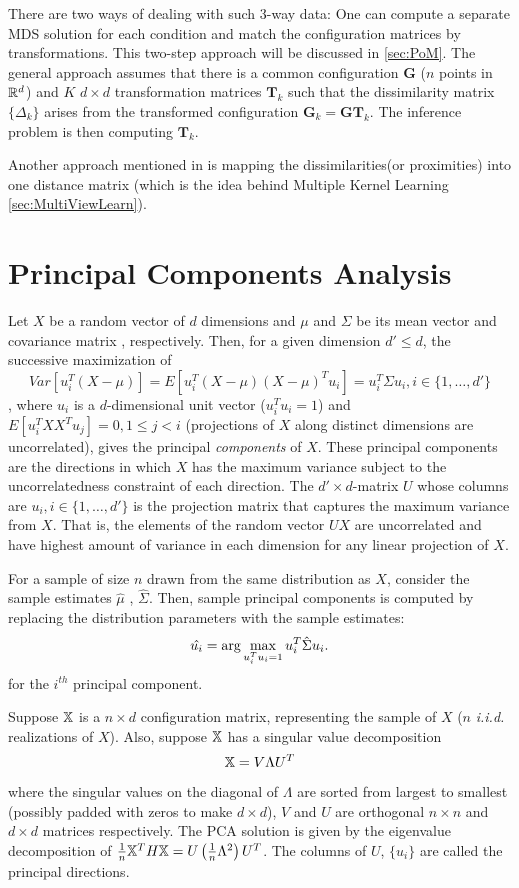 \documentclass[12pt,oneside,final]{thesis}\usepackage[]{graphicx}\usepackage[]{color}
\begin{document}
There are two ways of dealing with such 3-way data: One can compute a separate MDS solution for  each condition and match the configuration matrices by transformations. This two-step approach will be discussed in \autoref{sec:PoM}. The general approach assumes that there is a common configuration $\mathbf{G}$ ($n$ points in $\mathbb{R}^{d}$) and $K$ $d \times d$ transformation matrices ${\mathbf{T}_k}$ such that the dissimilarity matrix $\{\Delta_k\}$ arises  from the transformed configuration $\mathbf{G}_k =\mathbf{G}\mathbf{T}_k$. The inference problem is then computing $\mathbf{T}_k$.

Another approach mentioned in \cite{borg+groenen:1997} is  mapping the dissimilarities(or proximities) into one distance matrix (which is the idea behind Multiple Kernel Learning \ref{sec:MultiViewLearn}).


\section{Principal Components Analysis}
Let $X$ be a random vector of   $d$ dimensions and $\mu$ and $\Sigma$ be its mean vector and covariance matrix , respectively. Then, for a given dimension $d'\leq d$, the successive maximization of  $$Var[u_{i}^T (X-\mu)]= E[u_{i}^T (X-\mu)(X-\mu)^T u_i]=u_{i}^T\Sigma u_{i},  i \in \{1,\ldots,d'\}$$, where $u_{i}$ is a  $d$-dimensional unit vector ($u_i^Tu_i=1$)  and $E[u_{i}^T X X^T u_j]=0 , 1\leq j<i$ (projections of $X$ along distinct dimensions are uncorrelated), gives the principal \emph{components} of $X$. These principal components are the directions in which $X$ has the maximum variance subject to the uncorrelatedness constraint of each direction. The $d' \times d$-matrix $U$ whose columns are $u_i, i \in \{1,\ldots,d'\}$  is the projection matrix that captures the maximum variance from $X$. That is, the elements of the random vector $UX$ are uncorrelated and have highest amount of variance in each dimension for any linear projection of $X$.

For a sample of size $n$ drawn from the same distribution as $X$, consider the sample estimates $\hat{\mu}$ ,  $\hat{\Sigma} $. Then, sample principal components  is computed by replacing the distribution parameters with the sample estimates:
 \[\hat{u_i}=\arg\max_{u_i^Tu_i=1} u_{i}^T \hat{\Sigma}u_i. \]
for the $i^{th}$ principal component.

Suppose $\mathbb{X}$ is a $n \times d$ configuration matrix, representing the sample of $X$ ($n$ \textit{i.i.d.} realizations of $X$). Also, suppose $\mathbb{X}$ has a singular value decomposition $$\mathbb{X}= V\Lambda U^T$$ where the singular values on the diagonal of $\Lambda$ are sorted from largest to smallest (possibly padded with zeros to make \Lambda $d \times d$), $V$ and $U$ are orthogonal $n \times n$ and $d \times d$ matrices respectively. The PCA solution is  given by the eigenvalue decomposition of 
$\frac{1}{n} {\mathbb{X}}^T H \mathbb{X}=U \left( \frac{1}{n} \Lambda^2 \right) U^T$. The columns of $U$, $\{ u_i \}$ are called the principal directions. 
\end{document}
